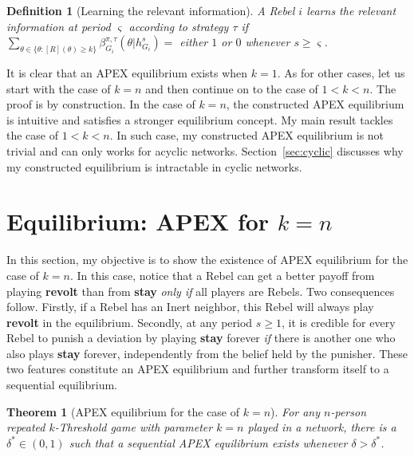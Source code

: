 \documentclass[12pt,letter]{article}
\newtheorem{theorem}{Theorem}
\newtheorem{definition}{Definition}[section]
\theoremstyle{definition}
\theoremstyle{remark}
\theoremstyle{claim}
\begin{document}
\begin{definition}[Learning the relevant information]\label{def_learn}
A Rebel $i$ learns the relevant information at period $\varsigma$ according to strategy $\tau$ if $\sum_{\theta\in\{\theta:[R](\theta)\geq k\}}\beta^{\pi,\tau}_{G_i}(\theta|h^{s}_{G_i})=$ either $1$ or $0$ whenever $s\geq \varsigma$.
\end{definition}

It is clear that an APEX equilibrium exists when $k=1$. As for other cases, let us start with the case of $k=n$ and then continue on to the case of $1<k<n$. The proof is by construction. In the case of $k=n$, the constructed APEX equilibrium is intuitive and satisfies a stronger equilibrium concept. My main result tackles the case of $1<k<n$. In such case, my constructed APEX equilibrium is not trivial and can only works for acyclic networks. Section~\ref{sec:cyclic} discusses why my constructed equilibrium is intractable in cyclic networks.

\section{Equilibrium: APEX for $k=n$}
\label{sec:equilibrium_1}

In this section, my objective is to show the existence of APEX equilibrium for the case of $k=n$. In this case, notice that a Rebel can get a better payoff from playing \textbf{revolt} than from \textbf{stay} \textit{only if} all players are Rebels. Two consequences follow. Firstly, if a Rebel has an Inert neighbor, this Rebel will always play \textbf{revolt} in the equilibrium. Secondly, at any period $s\geq 1$, it is credible for every Rebel to punish a deviation by playing \textbf{stay} forever \textit{if} there is another one who also plays \textbf{stay} forever, independently from the belief held by the punisher. These two features constitute an APEX equilibrium and further transform itself to a sequential equilibrium. 

\begin{theorem}[APEX equilibrium for the case of $k=n$]
\label{thm_minor_thm}
For any $n$-person repeated $k$-Threshold game with parameter $k=n$ played in a network, there is a $\delta^{*}\in(0,1)$ such that a sequential APEX equilibrium exists whenever $\delta >
\delta^{*}$.
\end{theorem}
\end{document}
